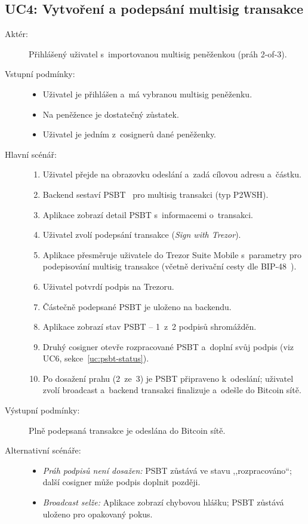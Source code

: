 \subsection{UC4: Vytvoření a podepsání multisig transakce}
\label{uc:multisig-sign}

\begin{description}
  \item[Aktér:] Přihlášený uživatel s~importovanou multisig peněženkou (práh 2-of-3).
  \item[Vstupní podmínky:] \hfill
    \begin{itemize}
      \item Uživatel je přihlášen a~má vybranou multisig peněženku.
      \item Na peněžence je dostatečný zůstatek.
      \item Uživatel je jedním z~cosignerů dané peněženky.
    \end{itemize}
  \item[Hlavní scénář:] \hfill
    \begin{enumerate}
      \item Uživatel přejde na obrazovku odeslání a~zadá cílovou adresu a~částku.
      \item Backend sestaví PSBT~\cite{BIP174} pro multisig transakci (typ P2WSH).
      \item Aplikace zobrazí detail PSBT s~informacemi o~transakci.
      \item Uživatel zvolí podepsání transakce (\emph{Sign with Trezor}).
      \item Aplikace přesměruje uživatele do Trezor Suite Mobile s~parametry pro
            podepisování multisig transakce (včetně derivační cesty dle
            BIP-48~\cite{BIP48}).
      \item Uživatel potvrdí podpis na Trezoru.
      \item Částečně podepsané PSBT je uloženo na backendu.
      \item Aplikace zobrazí stav PSBT -- 1~z~2 podpisů shromážděn.
      \item Druhý cosigner otevře rozpracované PSBT a~doplní svůj podpis
            (viz UC6, sekce~\ref{uc:psbt-status}).
      \item Po dosažení prahu (2~ze~3) je PSBT připraveno k~odeslání;
            uživatel zvolí broadcast a~backend transakci finalizuje
            a~odešle do Bitcoin sítě.
    \end{enumerate}
  \item[Výstupní podmínky:] Plně podepsaná transakce je odeslána do Bitcoin sítě.
  \item[Alternativní scénáře:] \hfill
    \begin{itemize}
      \item \emph{Práh podpisů není dosažen:} PSBT zůstává ve stavu ,,rozpracováno``;
            další cosigner může podpis doplnit později.
      \item \emph{Broadcast selže:} Aplikace zobrazí chybovou hlášku; PSBT zůstává
            uloženo pro opakovaný pokus.
    \end{itemize}
\end{description}

